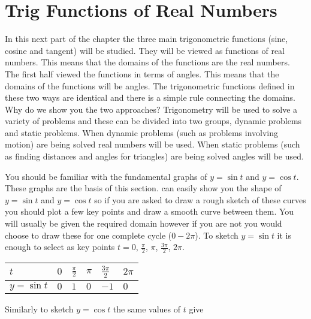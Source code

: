 \section{Trig Functions of Real Numbers}
In this next part of the chapter the three main trigonometric functions (sine, cosine and tangent) will be studied. They will be viewed as functions of real numbers. This means that the domains of the functions are the real numbers. The first half viewed the functions in terms of angles. This
means that the domains of the functions will be angles. The trigonometric functions defined in these two ways are identical and there is a simple rule connecting the domains. Why do we show you the two approaches? Trigonometry will be used to solve a variety of problems and these can be divided into two groups, dynamic problems and static problems. When dynamic problems (such as problems involving motion) are being solved real numbers will be used. When static problems (such as finding distances and angles for triangles) are being solved angles will be used. 

You should be familiar with the fundamental graphs of $y =\sin  t$ and $y =\cos  t$. These graphs are the basis of this section. \desmos can easily show you the shape of $y =\sin  t$ and $y =\cos  t$ so if you are asked to draw a rough sketch of these curves you should plot a few key points and draw a smooth curve between them. You will usually be given the required domain however if you are not you would choose to draw these for one complete cycle ($0 -2 \pi $). To sketch $y =\sin  t$ it is enough to select as key points $t =0$, $\frac{\pi }{2}$, $\pi $, $\frac{3 \pi }{2}$, $2 \pi $. 


\begin{tabular}[c]{|l|l|l|l|l|l|}\hline
	$t$  & $0$  & $\frac{\pi }{2}$  & $\pi $  & $\frac{3 \pi }{2}$  & $2 \pi $  \\
	\hline
	$y =\sin  t$  & $0$  & $1$  & $0$  & $ -1$  & $0$  \\
	\hline
\end{tabular}

Similarly to sketch $y =\cos  t$ the same values of $t$ give 


